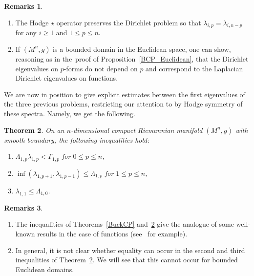\documentclass[pdftex]{sigma}
\numberwithin{equation}{section}
\newtheorem{Theorem}{Theorem}[section]
\theoremstyle{definition}
\newtheorem{Remarks}[Theorem]{Remarks}
\begin{document}
\begin{Remarks}\quad%
\begin{enumerate}\itemsep=0pt
\item The Hodge $\star$ operator preserves the Dirichlet problem so that $\lambda_{i,p}=\lambda_{i,n-p}$ for any $i\geq 1$ and $1\leq p\leq n$.
\item If $(M^n,g)$ is a bounded domain in the Euclidean space, one can show, reasoning as in the~proof of Proposition~\ref{BCP_Euclidean}, that the Dirichlet eigenvalues on $p$-forms do not depend on $p$ and correspond to the Laplacian Dirichlet eigenvalues on functions.
\end{enumerate}
\end{Remarks}

We are now in position to give explicit estimates between the first eigenvalues of the three previous problems, restricting our attention to  by Hodge symmetry of these spectra.
Namely, we get the following.

\begin{Theorem}\label{BCP_Dirichlet}
On an $n$-dimensional compact Riemannian manifold $(M^n,g)$ with smooth boundary, the following inequalities hold:
\begin{enumerate}\itemsep=0pt
\item[$(1)$] $\Lambda_{1,p} \lambda_{1,p}< \Gamma_{1,p}$ for $0\leq p\leq n$,
\item[$(2)$] $\inf(\lambda_{1,p+1}, \lambda_{1,p-1}) \le \Lambda_{1,p}$ for $1\leq p\leq n$,
\item[$(3)$] $\lambda_{1,1}\leq \Lambda_{1,0}$.
\end{enumerate}
\end{Theorem}

\begin{Remarks}\quad
\begin{enumerate}\itemsep=0pt
\item The inequalities of Theorems~\ref{BuckCP} and~\ref{BCP_Dirichlet} give the analogue of some well-known results in the case of functions (see~\cite{AL} for example).
\item In general, it is not clear whether equality can occur in the second and third inequalities of Theorem~\ref{BCP_Dirichlet}.
We will see that this cannot occur for bounded Euclidean domains.
\end{enumerate}
\end{Remarks}
\end{document}
